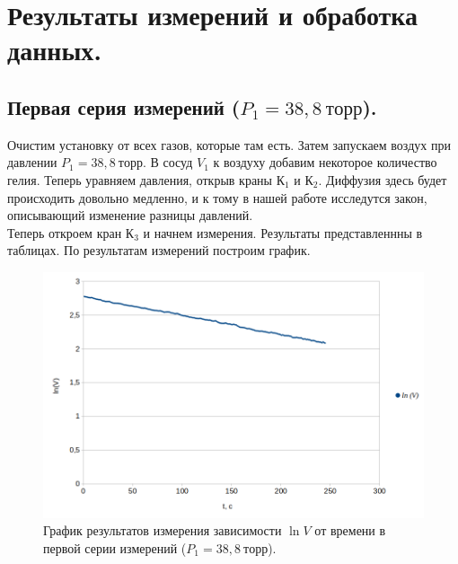 \documentclass[a4paper,11pt]{article}
\begin{document}
\section{Результаты измерений и обработка данных.}
\subsection{Первая серия измерений ($P_{1} = 38,8\ торр$).}
Очистим установку от всех газов, которые там есть. Затем запускаем воздух при давлении $P_{1} = 38,8\ торр$. В сосуд $V_{1}$ к воздуху добавим некоторое количество гелия. Теперь уравняем давления, открыв краны К$_{1}$ и К$_{2}$. Диффузия здесь будет происходить довольно медленно, и к тому в нашей работе исследутся закон, описывающий изменение разницы давлений.\\
Теперь откроем кран К$_{3}$ и начнем измерения. Результаты представленнны в таблицах.
По результатам измерений построим график.
\begin{figure}[h!]\label{fig:img3}
  \centering
  \includegraphics[scale = 0.4125]{graph1.png}
  \caption{График результатов измерения зависимости $\ln V$ от времени в первой серии измерений ($P_{1} = 38,8\ торр$).}
\end{figure}
\end{document}

